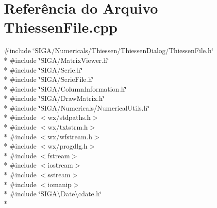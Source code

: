 \section{Referência do Arquivo Thiessen\+File.\+cpp}
\label{_thiessen_file_8cpp}
{\ttfamily \#include \char`\"{}S\+I\+G\+A/\+Numericals/\+Thiessen/\+Thiessen\+Dialog/\+Thiessen\+File.\+h\char`\"{}}\\*
{\ttfamily \#include \char`\"{}S\+I\+G\+A/\+Matrix\+Viewer.\+h\char`\"{}}\\*
{\ttfamily \#include \char`\"{}S\+I\+G\+A/\+Serie.\+h\char`\"{}}\\*
{\ttfamily \#include \char`\"{}S\+I\+G\+A/\+Serie\+File.\+h\char`\"{}}\\*
{\ttfamily \#include \char`\"{}S\+I\+G\+A/\+Column\+Information.\+h\char`\"{}}\\*
{\ttfamily \#include \char`\"{}S\+I\+G\+A/\+Draw\+Matrix.\+h\char`\"{}}\\*
{\ttfamily \#include \char`\"{}S\+I\+G\+A/\+Numericals/\+Numerical\+Utils.\+h\char`\"{}}\\*
{\ttfamily \#include $<$wx/stdpaths.\+h$>$}\\*
{\ttfamily \#include $<$wx/txtstrm.\+h$>$}\\*
{\ttfamily \#include $<$wx/wfstream.\+h$>$}\\*
{\ttfamily \#include $<$wx/progdlg.\+h$>$}\\*
{\ttfamily \#include $<$fstream$>$}\\*
{\ttfamily \#include $<$iostream$>$}\\*
{\ttfamily \#include $<$sstream$>$}\\*
{\ttfamily \#include $<$iomanip$>$}\\*
{\ttfamily \#include \char`\"{}S\+I\+G\+A\textbackslash{}\+Date\textbackslash{}cdate.\+h\char`\"{}}\\*
